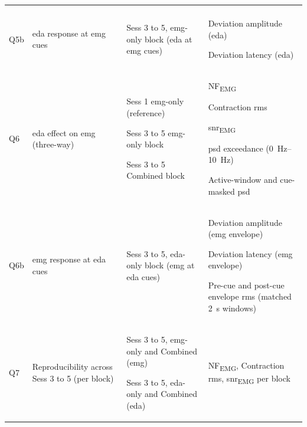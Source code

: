 {\begin{xltabular}{\widetable}{>{\centering\arraybackslash}p{0.5cm} >{\raggedright\arraybackslash}p{2.4cm} >{\raggedright\arraybackslash}p{2.8cm} >{\raggedright\arraybackslash}X}
\begin{tabitemize}
\end{tabitemize} \\
\addlinespace
Q5b & \gls{eda} response at \gls{emg} cues &
Sess 3 to 5, \gls{emg}-only block (\gls{eda} at \gls{emg} cues) &
\begin{tabitemize}
  \item Deviation amplitude (\gls{eda})
  \item Deviation latency (\gls{eda})
\end{tabitemize} \\
\addlinespace
Q6 & \gls{eda} effect on \gls{emg} (three-way) &
\begin{tabitemize}
  \item Sess 1 \gls{emg}-only (reference)
  \item Sess 3 to 5 \gls{emg}-only block
  \item Sess 3 to 5 Combined block
\end{tabitemize} &
\begin{tabitemize}
  \item NF\textsubscript{EMG}
  \item Contraction \gls{rms}
  \item \gls{snr}\textsubscript{EMG}
  \item \gls{psd} exceedance (\SIrange{0}{10}{\hertz})
  \item Active-window and cue-masked \gls{psd}
\end{tabitemize} \\
\addlinespace
Q6b & \gls{emg} response at \gls{eda} cues &
Sess 3 to 5, \gls{eda}-only block (\gls{emg} at \gls{eda} cues) &
\begin{tabitemize}
  \item Deviation amplitude (\gls{emg} envelope)
  \item Deviation latency (\gls{emg} envelope)
  \item Pre-cue and post-cue envelope \gls{rms} (matched \SI{2}{\second} windows)
\end{tabitemize} \\
\addlinespace
Q7 & Reproducibility across Sess 3 to 5 (per block) &
\begin{tabitemize}
  \item Sess 3 to 5, \gls{emg}-only and Combined (\gls{emg})
  \item Sess 3 to 5, \gls{eda}-only and Combined (\gls{eda})
\end{tabitemize} &
\begin{tabitemize}
  \item NF\textsubscript{EMG}, Contraction \gls{rms}, \gls{snr}\textsubscript{EMG} per block

\end{tabitemize}
\end{xltabular}}
